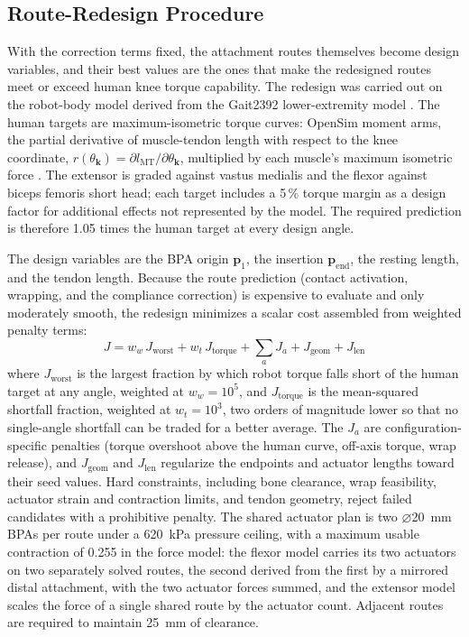 \documentclass[utf8]{FrontiersinHarvard} %
\begin{document}
\subsection{Route-Redesign Procedure}\label{sec:route_redesign}

With the correction terms fixed, the attachment routes themselves become design variables, and their best values are the ones that make the redesigned routes meet or exceed human knee torque capability. The redesign was carried out on the robot-body model derived from the Gait2392 lower-extremity model \citep{delp_opensim_2007,seth_opensim_2018}. The human targets are maximum-isometric torque curves: OpenSim moment arms, the partial derivative of muscle-tendon length with respect to the knee coordinate, $r(\theta_{\mathbf{k}}) = \partial l_{\mathrm{MT}}/\partial\theta_{\mathbf{k}}$, multiplied by each muscle's maximum isometric force \citep{delp_interactive_1990,hoy_musculoskeletal_1990,yamaguchi_planar_1989,sherman_what_2013,millard_flexing_2013,thelen_adjustment_2003,seth_opensim_2011}. The extensor is graded against vastus medialis and the flexor against biceps femoris short head; each target includes a 5\,\% torque margin as a design factor for additional effects not represented by the model. The required prediction is therefore 1.05 times the human target at every design angle.

The design variables are the BPA origin $\mathbf{p}_{1}$, the insertion $\mathbf{p}_{\mathrm{end}}$, the resting length, and the tendon length. Because the route prediction (contact activation, wrapping, and the compliance correction) is expensive to evaluate and only moderately smooth, the redesign minimizes a scalar cost assembled from weighted penalty terms:
\begin{equation}
    J = w_{w}\,J_{\text{worst}} + w_{t}\,J_{\text{torque}} + \textstyle\sum_{a} J_{a} + J_{\text{geom}} + J_{\text{len}}
    \label{eq:opt_cost}
\end{equation}
where $J_{\text{worst}}$ is the largest fraction by which robot torque falls short of the human target at any angle, weighted at $w_{w} = 10^{5}$, and $J_{\text{torque}}$ is the mean-squared shortfall fraction, weighted at $w_{t} = 10^{3}$, two orders of magnitude lower so that no single-angle shortfall can be traded for a better average. The $J_{a}$ are configuration-specific penalties (torque overshoot above the human curve, off-axis torque, wrap release), and $J_{\text{geom}}$ and $J_{\text{len}}$ regularize the endpoints and actuator lengths toward their seed values. Hard constraints, including bone clearance, wrap feasibility, actuator strain and contraction limits, and tendon geometry, reject failed candidates with a prohibitive penalty. The shared actuator plan is two $\diameter$\qty{20}{\mm} BPAs per route under a \qty{620}{\kPa} pressure ceiling, with a maximum usable contraction of 0.255 in the force model: the flexor model carries its two actuators on two separately solved routes, the second derived from the first by a mirrored distal attachment, with the two actuator forces summed, and the extensor model scales the force of a single shared route by the actuator count. Adjacent routes are required to maintain \qty{25}{\mm} of clearance.
\end{document}

